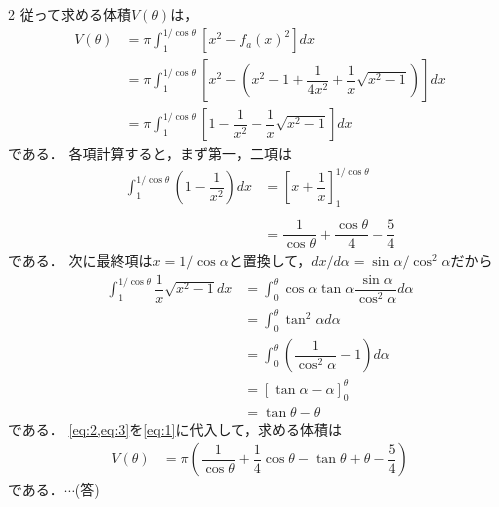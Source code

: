 \documentclass[../../main.tex]{subfiles}
\begin{document}
\begin{multicols}{2}
  従って求める体積$V(\theta)$は，
  \begin{align}
    V(\theta)
    & = \pi \int_1^{1/\cos\theta} \left[x^2 - f_a(x)^2\right] dx                                                       \\
    & = \pi \int_1^{1/\cos\theta} \left[x^2 - \left(x^2-1 + \dfrac{1}{4x^2} + \dfrac{1}{x}\sqrt{x^2-1}\right)\right]  dx \\
    & = \pi \int_1^{1/\cos\theta} \left[1 - \dfrac{1}{x^2} - \dfrac{1}{x}\sqrt{x^2-1}\right]  dx \label{eq:1}
  \end{align}
  である．
  各項計算すると，まず第一，二項は
  \begin{align}
    \int_1^{1/\cos\theta} \left(1-\dfrac{1}{x^2}\right)dx
    & = \left[x + \dfrac{1}{x}\right]_{1}^{1/\cos\theta}                              \\                                                                          \\
    & = \dfrac{1}{\cos\theta} + \dfrac{\cos\theta}{4} - \dfrac{5}{4}\label{eq:2}
  \end{align}
  である．
  次に最終項は$x=1/\cos\alpha$と置換して，$dx/d\alpha = \sin\alpha/\cos^2\alpha$だから
  \begin{align}
    \int_1^{1/\cos\theta} \dfrac{1}{x}\sqrt{x^2-1} dx
    & = \int_0^{\theta} \cos\alpha\tan\alpha \dfrac{\sin\alpha}{\cos^2\alpha}d\alpha \\
    & = \int_0^{\theta} \tan^2\alpha d\alpha                                        \\
    & = \int_0^{\theta} \left(\dfrac{1}{\cos^2\alpha}-1\right) d\alpha               \\
    & = \left[\tan\alpha-\alpha\right]_0^{\theta}                                   \\
    & = \tan\theta - \theta \label{eq:3}
  \end{align}
  である．
  \cref{eq:2,eq:3}を\cref{eq:1}に代入して，求める体積は
  \begin{align}
    V(\theta)
    & = \pi \left( \dfrac{1}{\cos\theta} + \dfrac{1}{4}\cos\theta - \tan\theta + \theta - \dfrac{5}{4} \right)
  \end{align}
  である．$\cdots$(答)


\end{multicols}
\end{document}
